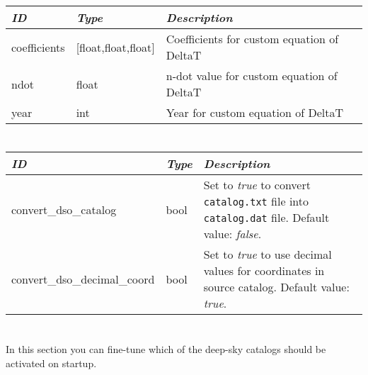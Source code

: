\begin{longtabu} to \textwidth {l|l|X}
\toprule
\emph{ID} & \emph{Type} & \emph{Description}\\
\midrule
coefficients & {[}float,float,float{]} & Coefficients for
custom equation of DeltaT\\
\midrule
ndot & float & n-dot value for custom equation of
DeltaT\\
\midrule
year & int & Year for custom equation of DeltaT\\
\bottomrule
\end{longtabu}

\section{}
\label{sec:config.ini:devel}

\begin{longtabu} to \textwidth {l|l|X}
\toprule
\emph{ID} & \emph{Type} & \emph{Description}\\
\midrule
convert\_dso\_catalog & bool & Set to
\emph{true} to convert \texttt{catalog.txt} file into
\texttt{catalog.dat} file. Default value: \emph{false}.\\
\midrule
convert\_dso\_decimal\_coord & bool & Set to
\emph{true} to use decimal values for coordinates in source
catalog. Default value: \emph{true}.\\
\bottomrule
\end{longtabu}

\section{}
\label{sec:config.ini:dso_catalog_filters}
In this section you can fine-tune which of the deep-sky catalogs should be activated on startup.

